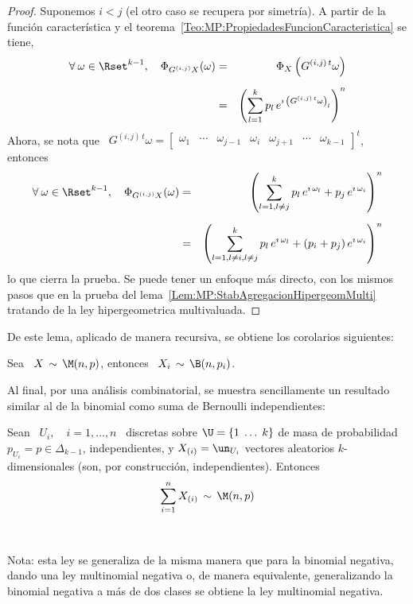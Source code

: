 \begin{proof}
  Suponemos $i <  j$ (el otro caso  se recupera por simetr\'ia). A  partir de la
  funci\'on                 caracter\'istica                 y                el
  teorema~\ref{Teo:MP:PropiedadesFuncionCaracteristica} se tiene,
  \begin{eqnarray*}
  \forall \: \omega \in \Rset^{k-1}, \quad \Phi_{G^{(i,j)} X}(\omega) & = &
  \Phi_X\left( G^{(i,j) \, t} \omega \right)\\[2mm]
  & = & \left( \sum_{l=1}^k p_l \, e^{\imath \, \left( G^{(i,j) \, t} \omega \right)_l } \right)^n
  \end{eqnarray*}
  Ahora,  se nota  que \  $G^{(i,j) \,  t} \omega  = \begin{bmatrix}  \omega_1 &
    \cdots    &   \omega_{j-1}   &    \omega_i   &    \omega_{j+1}   &    \cdots   &
    \omega_{k-1} \end{bmatrix}^t$, entonces
  \begin{eqnarray*}
  \forall \: \omega \in \Rset^{k-1}, \quad \Phi_{G^{(i,j)} X}(\omega) & = &
  \left( \sum_{l=1, l \ne j}^k p_l \, e^{\imath \, \omega_l} + p_j \, e^{\imath \,
  \omega_i } \right)^n\\[2mm]
  & = & \left( \sum_{l=1, l \ne i, l \ne j}^k p_l \, e^{\imath \, \omega_l} +
  (p_i+p_j) \, e^{\imath \, \omega_i } \right)^n
  \end{eqnarray*}
  lo que  cierra la  prueba. Se puede  tener un  enfoque m\'as directo,  con los
  mismos         pasos        que         en        la         prueba        del
  lema~\ref{Lem:MP:StabAgregacionHipergeomMulti}    tratando     de    la    ley
  hipergeometrica multivaluada.
\end{proof}

De este lema, aplicado de manera recursiva, se obtiene los corolarios siguientes:
%
\begin{corolario}\label{Cor:MP:MarginalMultinomial}
%
  Sea  \ $X  \,  \sim \,  \M(n,p)$, entonces  \  $\displaystyle X_i  \, \sim  \,
  \B(n,p_i)$.
\end{corolario}


Al  final,  por  una  an\'alisis  combinatorial,  se  muestra  sencillamente  un
resultado similar al de la binomial como suma de Bernoulli independientes:
%
\begin{lema}\label{Lem:MultinomialSumaMultiBernoulli}
%
  Sean \ $U_i, \quad i  = 1, \ldots , n$ \ discretas sobre $\U  = \{ 1 \; \ldots
  \;  k   \}$  de  masa  de   probabilidad  $p_{U_i}  =   p  \in  \Delta_{k-1}$,
  independientes, y $X_{(i)}  = \un_{U_i}$ vectores aleatorios $k$-dimensionales
  (son, por construcci\'on, independientes). Entonces
  \[
  \sum_{i=1}^n X_{(i)} \, \sim \, \M(n,p)
  \]
\end{lema}

\

Nota: esta ley  se generaliza de la misma manera que  para la binomial negativa,
dando una  ley multinomial negativa  o, de manera equivalente,  generalizando la
binomial  negativa  a  m\'as  de  dos  clases  se  obtiene  la  ley  multinomial
negativa. 
